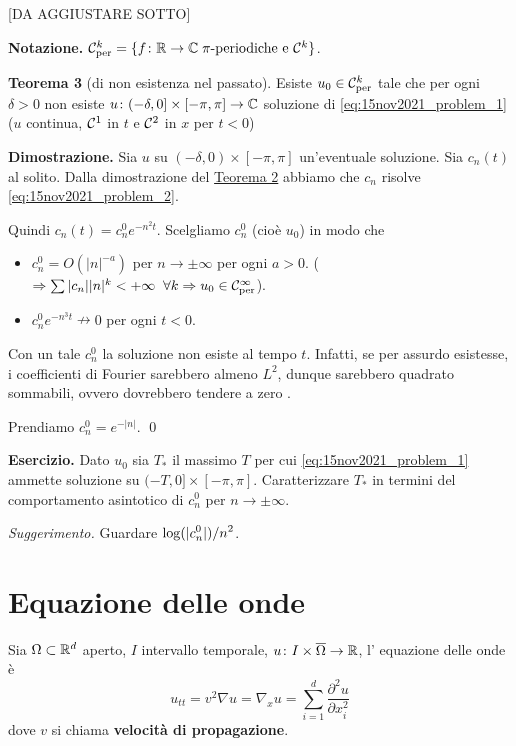 %
%

[DA AGGIUSTARE SOTTO]

\textbf{Notazione.} $\mathcal{C}_{\operatorname{per}}^k = \{ f\colon  \mathbb R \to \mathbb C \; \pi\text{-periodiche e } \mathcal{C}^k \} $.

\textbf{Teorema 3} (di non esistenza nel passato).
Esiste $u_0 \in \mathcal{C}_{\operatorname{per}}^k$ tale che per ogni $\delta > 0$ non esiste $u \colon (-\delta,0] \times [-\pi,\pi] \to \mathbb C$ soluzione di \eqref{eq:15nov2021_problem_1} ($u$ continua, $\mathcal{C}^1$ in $t$ e $\mathcal{C}^2$ in $x$ per $t < 0$)

\textbf{Dimostrazione.} Sia $u$ su $(-\delta,0) \times [-\pi,\pi]$ un'eventuale soluzione.
Sia $c_n(t)$ al solito.
Dalla dimostrazione del \hyperlink{thm:lez15nov_teo2}{Teorema 2} abbiamo che $c_n$ risolve \eqref{eq:15nov2021_problem_2}.

Quindi $c_n(t) = c_n^0 e^{-n^2 t}$. Scelgliamo $c_n^0$ (cioè $u_0$) in modo che

\begin{itemize}

	\item $c_n^0 = O(|n|^{-a})$ per $n \to \pm \infty$ per ogni $a > 0$. ($\Rightarrow \sum |c_n| |n|^k < +\infty \;\; \forall k \Rightarrow u_0 \in \mathcal{C}_{\operatorname{per}}^\infty$).


	\item $c_n^0 e^{-n^3 t} \nrightarrow 0$ per ogni $t < 0$.

\end{itemize}

Con un tale $c_n^0$ la soluzione non esiste al tempo $t$. Infatti, se per assurdo esistesse, i coefficienti di Fourier sarebbero almeno $L^2$, dunque sarebbero quadrato sommabili, ovvero dovrebbero tendere a zero \absurd.

Prendiamo $c_n^0 = e^{-|n|}$.
\qed

\textbf{Esercizio.} Dato $u_0$ sia $T_\ast $ il massimo $T$ per cui \eqref{eq:15nov2021_problem_1} ammette soluzione su $(-T,0] \times [-\pi,\pi]$.
Caratterizzare $T_\ast$ in termini del comportamento asintotico di $c_n^0$ per $n \to \pm \infty$.

\textit{Suggerimento.} Guardare $\displaystyle \log(|c_n^0|) / n^2$.


\section{Equazione delle onde}

Sia $\Omega \subset \mathbb R^d$ aperto, $I$ intervallo temporale, $u \colon I \times \overline{\Omega} \to \mathbb R$, l' equazione delle onde è
%
$$
	u_{tt} = v^2 \nabla u = \nabla_x u = \sum_{i=1}^{d} \frac{\partial^2 u}{\partial x_i^2}
$$
%
dove $v$ si chiama \textbf{velocità di propagazione}.

